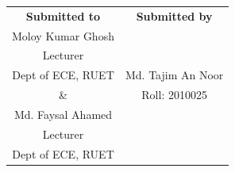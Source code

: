 \begin{center}
    \begin{tabular}{c|c}
        \textbf{Submitted to} & \textbf{Submitted by} \\
        Moloy Kumar Ghosh     &                       \\
        Lecturer              &                       \\
        Dept of ECE, RUET     & Md. Tajim An Noor     \\
        \&                    & Roll: 2010025         \\
        Md. Faysal Ahamed     &                       \\
        Lecturer              &                       \\
        Dept of ECE, RUET     &                       \\
    \end{tabular}

\end{center}
\vspace*{\fill}

